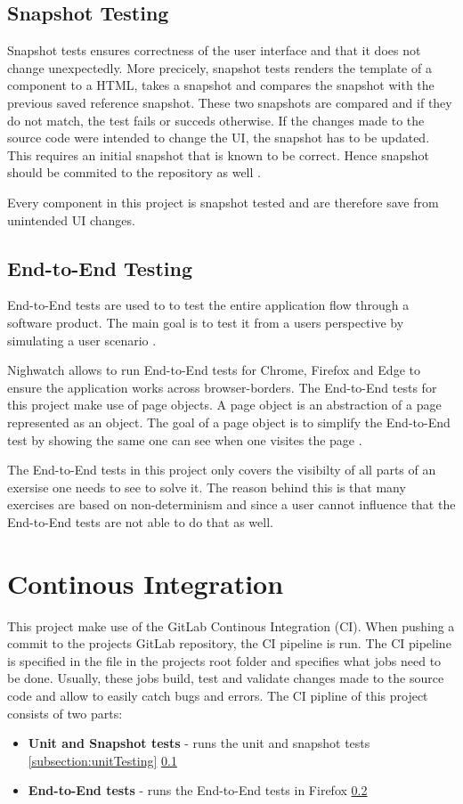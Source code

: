 \subsection{Snapshot Testing}
\label{subsection:snapshotTesting}
Snapshot tests ensures correctness of the user interface and that it does not change unexpectedly. More precicely, snapshot tests renders the template of a component to a HTML, takes a snapshot and compares the snapshot with the previous saved reference snapshot. These two snapshots are compared and if they do not match, the test fails or succeds otherwise. If the changes made to the source code were intended to change the UI, the snapshot has to be updated. This requires an initial snapshot that is known to be correct. Hence snapshot should be commited to the repository as well \cite{Jest}.

Every component in this project is snapshot tested and are therefore save from unintended UI changes.

\subsection{End-to-End Testing}
\label{subsection:e2e}
End-to-End tests are used to to test the entire application flow through a software product. The main goal is to test it from a users perspective by simulating a user scenario \cite{EndToEndTests}. 

Nighwatch allows to run End-to-End tests for Chrome, Firefox and Edge to ensure the application works across browser-borders. The End-to-End tests for this project make use of page objects. A page object is an abstraction of a page represented as an object. The goal of a page object is to simplify the End-to-End test by showing the same one can see when one visites the page \cite{Nightwatch}.

The End-to-End tests in this project only covers the visibilty of all parts of an exersise one needs to see to solve it. The reason behind this is that many exercises are based on non-determinism and since a user cannot influence that the End-to-End tests are not able to do that as well.

\section{Continous Integration}
\label{section:CI}

This project make use of the GitLab Continous Integration (CI). When pushing a commit to the projects GitLab repository, the CI pipeline is run. The CI pipeline is specified in the  file in the projects root folder and specifies what jobs need to be done. Usually, these jobs build, test and validate changes made to the source code and allow to easily catch bugs and errors.
The CI pipline of this project consists of two parts:

\begin{itemize}
    \item \textbf{Unit and Snapshot tests} - runs the unit and snapshot tests \ref{subsection:unitTesting} \ref{subsection:snapshotTesting}
    \item \textbf{End-to-End tests} - runs the End-to-End tests in Firefox \ref{subsection:e2e}
\end{itemize}

